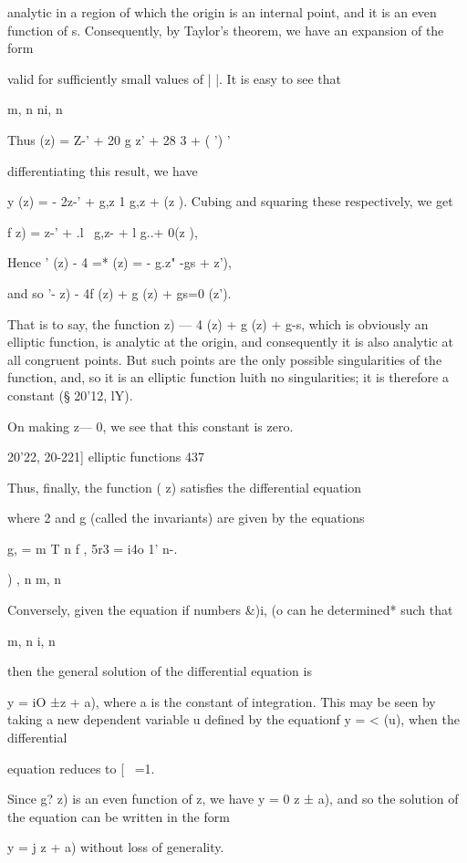 {analytic in a region of which the origin is an internal point, and it
is an even function of s. Consequently, by Taylor's theorem, we have
an expansion of the form

valid for sufficiently small values of | |. It is easy to see that

m, n ni, n

Thus (z) = Z-' + 20 g z' + 28 3 + ( ') '

differentiating this result, we have

 y (z) = - 2z-' + g,z 1 g,z + (z ). Cubing and squaring these
respectively, we get

f z) = z-' + .l~ g,z- + l g..+ 0(z ),

Hence ' (z) - 4 =* (z) = - g.z" -gs + z'),

and so '- z) - 4f (z) + g (z) + gs=0 (z').

That is to say, the function z) — 4 (z) + g (z) + g-s, which is
obviously an elliptic function, is analytic at the origin, and
consequently it is also analytic at all congruent points. But such
points are the only possible singularities of the function, and, so it
is an elliptic function luith no singularities; it is therefore a
constant (§ 20'12, lY).

On making z— 0, we see that this constant is zero.



20'22, 20-221] elliptic functions 437

Thus, finally, the function ( z) satisfies the differential equation

where 2 and g (called the invariants) are given by the equations

g, = m T n f , 5r3 = i4o 1' n-.

) , n m, n

Conversely, given the equation if numbers \&)i, (o can he determined*
such that

m, n i, n

then the general solution of the differential equation is

y = iO ±z + a), where a is the constant of integration. This may be
seen by taking a new dependent variable u defined by the equationf y =
< (u), when the differential

equation reduces to [ \ =1.

Since g? z) is an even function of z, we have y = 0 z ± a), and so the
solution of the equation can be written in the form

y = j z + a) without loss of generality.

}
